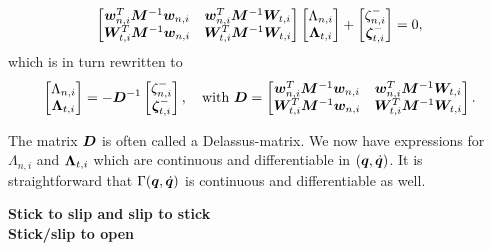 \documentclass[../DC2017114Bouma.tex]{subfiles}
\begin{document}
\begin{align}
\begin{bmatrix}
{\boldsymbol{w}}_{n,i}^T{\boldsymbol{M}}^{-1}{\boldsymbol{w}}_{n,i} & {\boldsymbol{w}}_{n,i}^T{\boldsymbol{M}}^{-1}{\boldsymbol{W}}_{t,i} \\
{\boldsymbol{W}}_{t,i}^T{\boldsymbol{M}}^{-1}{\boldsymbol{w}}_{n,i} & {\boldsymbol{W}}_{t,i}^T{\boldsymbol{M}}^{-1}{\boldsymbol{W}}_{t,i}
\end{bmatrix}
\begin{bmatrix}
\Lambda_{n,i}\\
\boldsymbol{\Lambda}_{t,i}
\end{bmatrix} + \begin{bmatrix}
\zeta_{n,i}^-\\
\boldsymbol{\zeta}_{t,i}^-
\end{bmatrix}
= 0,
\end{align}
which is in turn rewritten to
\begin{align}
\begin{bmatrix}
\Lambda_{n,i}\\
\boldsymbol{\Lambda}_{t,i}
\end{bmatrix} = - {\boldsymbol{D}}^{-1}\begin{bmatrix}
\zeta_{n,i}^-\\
\boldsymbol{\zeta}_{t,i}^-
\end{bmatrix},\quad \text{with } {\boldsymbol{D}} = \begin{bmatrix}
{\boldsymbol{w}}_{n,i}^T{\boldsymbol{M}}^{-1}{\boldsymbol{w}}_{n,i} & {\boldsymbol{w}}_{n,i}^T{\boldsymbol{M}}^{-1}{\boldsymbol{W}}_{t,i} \\
{\boldsymbol{W}}_{t,i}^T{\boldsymbol{M}}^{-1}{\boldsymbol{w}}_{n,i} & {\boldsymbol{W}}_{t,i}^T{\boldsymbol{M}}^{-1}{\boldsymbol{W}}_{t,i}
\end{bmatrix}.
\end{align}

The matrix ${\boldsymbol{D}}$ is often called a Delassus-matrix. We now have expressions for $\Lambda_{n,i}$ and $\boldsymbol{\Lambda}_{t,i}$ which are continuous and differentiable in $({\boldsymbol{q}},\dot{{\boldsymbol{q}}})$. It is straightforward that $\Gamma({\boldsymbol{q}},\dot{{\boldsymbol{q}}})$ is continuous and differentiable as well.

\textbf{Stick to slip and slip to stick}\\

\textbf{Stick/slip to open}\\
\end{document}
